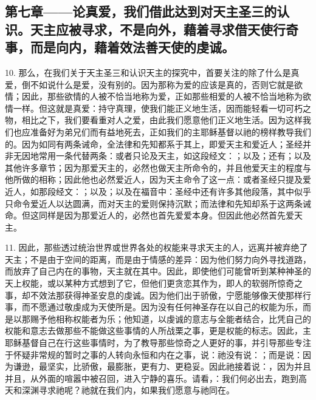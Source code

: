 
\subsection{第七章——论真爱，我们借此达到对天主圣三的认识。天主应被寻求，不是向外，藉着寻求借天使行奇事，而是向内，藉着效法善天使的虔诚。}

10. 那么，在我们关于天主圣三和认识天主的探究中，首要关注的除了什么是真爱，倒不如说什么是爱，没有别的。因为那称为爱的应该是真的，否则它就是欲情；因此，那些欲情的人被不恰当地称为爱，正如那些相爱的人被不恰当地称为欲情一样。但这就是真爱：持守真理，使我们能正义地生活，因而能轻看一切可朽之物，相比之下，我们要看重对人之爱，由此我们愿意他们正义地生活。因为这样我们也应准备好为弟兄们而有益地死去，正如我们的主耶稣基督以祂的榜样教导我们的。因为如同有两条诫命，全法律和先知都系于其上，即爱天主和爱近人；圣经并非无因地常用一条代替两条：或者只论及天主，如这段经文：；以及；还有；以及其他许多章节；因为那爱天主的，必然也做天主所命令的，并且他爱天主的程度与他所做的相称；因此他也必然爱近人，因为天主命令了这一点：或者圣经只提及爱近人，如那段经文：；以及；以及在福音中：圣经中还有许多其他段落，其中似乎只命令爱近人以达圆满，而对天主的爱则保持沉默；而法律和先知却系于这两条诫命。但这同样是因为那爱近人的，必然也首先爱爱本身。但因此他必然首先爱天主。\par

11. 因此，那些透过统治世界或世界各处的权能来寻求天主的人，远离并被弃绝了天主；不是由于空间的距离，而是由于情感的差异：因为他们努力向外寻找道路，而放弃了自己内在的事物，天主就在其中。因此，即使他们可能曾听到某种神圣的天上权能，或以某种方式想到了它，但他们更贪恋其作为，即人的软弱所惊奇之事，却不效法那获得神圣安息的虔诚。因为他们出于骄傲，宁愿能够像天使那样行事，而不愿通过敬虔成为天使所是。因为没有任何神圣存在以自己的权能为乐，而是以那赐予他相称权能者为乐；他知道，以虔诚的意志与全能者结合，比凭自己的权能和意志去做那些不能做这些事情的人所战栗之事，更是权能的标志。因此，主耶稣基督自己在行这些事情时，为了教导那些惊奇之人更好的事，并引导那些专注于怀疑非常规的暂时之事的人转向永恒和内在之事，说：祂没有说：；而是说：因为谦逊，最坚实，比骄傲，最膨胀，更有力、更稳妥。因此祂接着说：，因为并且并且，从外面的喧嚣中被召回，进入宁静的喜乐。请看，：我们何必出去，跑到高天和深渊寻求祂呢？祂就在我们内，如果我们愿意与祂同在。\par

